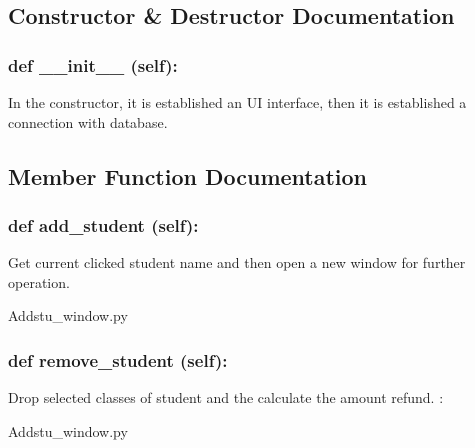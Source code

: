 \subsection{Constructor \& Destructor Documentation}
\hypertarget{class_poly_aa3def076b74bed67904976ad4f9fe9b1}{
\subsubsection[{def __init__ (self):}]{\setlength{\rightskip}{0pt plus 5cm}def {\_\_init\_\_} (self): 
}}

In the constructor, it is established an UI interface, then it is  established a connection with database.

\subsection{Member Function Documentation}

\hypertarget{class_poly_a14a7ad77ce612b0c54f531d307ee4b39}{
\subsubsection[{def add_student(self):}]{\setlength{\rightskip}{0pt plus 5cm}def {add\_student} (self):}}\label{class_poly_a14a7ad77ce612b0c54f531d307ee4b39}
Get current clicked student name and then open a new window for further operation.
\begin{DoxyCompactItemize}
\item 
Addstu\_window.\-py\end{DoxyCompactItemize}

\hypertarget{class_poly_a14a7ad77ce612b0c54f531d307ee4b39}{
\subsubsection[{def remove_student(self):}]{\setlength{\rightskip}{0pt plus 5cm}def {remove\_student} (self):}}\label{class_poly_a14a7ad77ce612b0c54f531d307ee4b39}
Drop selected classes of student and the calculate the amount refund.
:\begin{DoxyCompactItemize}
\item 
Addstu\_window.\-py\end{DoxyCompactItemize}

